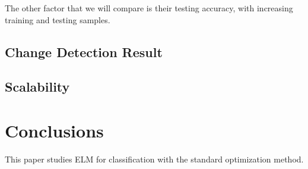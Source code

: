 \documentclass{elsart}
\begin{document}
The other factor that we will compare is their testing accuracy, with increasing training and testing samples.

\subsection{Change Detection Result}

\subsection{Scalability}






\section{Conclusions}\label{conclusion}

This paper studies ELM for classification with the standard optimization method. 



\end{document}
